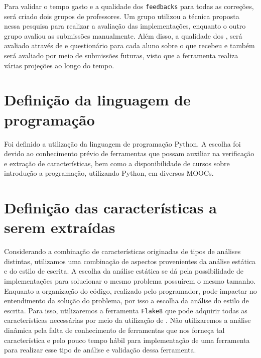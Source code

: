 	 	Para validar o tempo gasto e a qualidade dos \texttt{feedbacks} para todas as correções,
	 	será criado dois grupos de professores. Um grupo utilizou a técnica proposta nessa pesquisa para
	 	realizar a avaliação das implementações, enquanto o outro grupo avaliou as submissões
	 	manualmente. Além disso, a qualidade dos , será avaliado através de 
	 	e questionário para cada aluno sobre o  que recebeu e também será avaliado
	 	por meio de submissões futuras, visto que a ferramenta realiza várias projeções ao longo do tempo.

	\section{Definição da linguagem de programação}
		Foi definido a utilização da linguagem de programação Python. A escolha foi
		devido ao conhecimento prévio de ferramentas que possam auxiliar na verificação
		e extração de características, bem como a disponibilidade de cursos sobre
		introdução a programação, utilizando Python, em diversos \acs{MOOC}s.

	\section{Definição das características a serem extraídas}
		Considerando a combinação de características originadas de tipos de análises
		distintas, utilizamos uma combinação de aspectos provenientes da análise  %
		estática e do estilo de escrita. A escolha da análise estática se dá pela
		possibilidade de implementações para solucionar o mesmo problema possuírem
		o mesmo tamanho. Enquanto a organização do código, realizado pelo programador,
		pode impactar no entendimento da solução do problema, por isso a escolha da
		análise do estilo de escrita. Para isso, utilizaremos a ferramenta \texttt{Flake8}
		\cite{flake8} que pode adquirir todas as características necessárias por meio da
		utilização de . Não utilizaremos a análise dinâmica pela falta
		de conhecimento de ferramentas que nos forneça tal característica e pelo pouco
		tempo hábil para implementação de uma ferramenta para realizar esse tipo de
		análise e validação dessa ferramenta.
		
